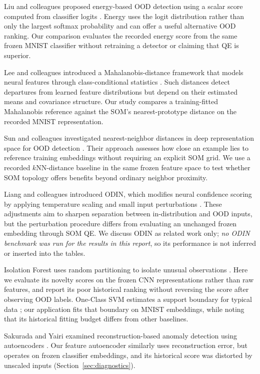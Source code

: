 \documentclass[11pt]{article}
\begin{document}
Liu and colleagues proposed energy-based OOD detection using a scalar score computed from classifier logits \parencite{liu2020energy}. Energy uses the logit distribution rather than only the largest softmax probability and can offer a useful alternative OOD ranking. Our comparison evaluates the recorded energy score from the same frozen MNIST classifier without retraining a detector or claiming that QE is superior.

Lee and colleagues introduced a Mahalanobis-distance framework that models neural features through class-conditional statistics \parencite{lee2018mahalanobis}. Such distances detect departures from learned feature distributions but depend on their estimated means and covariance structure. Our study compares a training-fitted Mahalanobis reference against the SOM's nearest-prototype distance on the recorded MNIST representation.

Sun and colleagues investigated nearest-neighbor distances in deep representation space for OOD detection \parencite{sun2022knn}. Their approach assesses how close an example lies to reference training embeddings without requiring an explicit SOM grid. We use a recorded $k$NN-distance baseline in the same frozen feature space to test whether SOM topology offers benefits beyond ordinary neighbor proximity.

Liang and colleagues introduced ODIN, which modifies neural confidence scoring by applying temperature scaling and small input perturbations \parencite{liang2018odin}. These adjustments aim to sharpen separation between in-distribution and OOD inputs, but the perturbation procedure differs from evaluating an unchanged frozen embedding through SOM QE. We discuss ODIN as related work only; \emph{no ODIN benchmark was run for the results in this report}, so its performance is not inferred or inserted into the tables.

Isolation Forest uses random partitioning to isolate unusual observations \parencite{liu2008isolation}. Here we evaluate its novelty scores on the frozen CNN representations rather than raw features, and report its poor historical ranking without reversing the score after observing OOD labels. One-Class SVM estimates a support boundary for typical data \parencite{scholkopf2001support}; our application fits that boundary on MNIST embeddings, while noting that its historical fitting budget differs from other baselines.

Sakurada and Yairi examined reconstruction-based anomaly detection using autoencoders \parencite{sakurada2014autoencoder}. Our feature autoencoder similarly uses reconstruction error, but operates on frozen classifier embeddings, and its historical score was distorted by unscaled inputs (Section~\ref{sec:diagnostics}).
\end{document}
